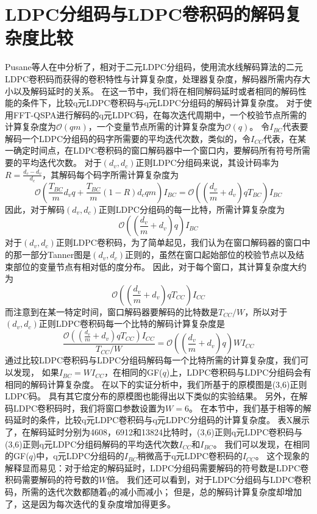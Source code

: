 \section{LDPC分组码与LDPC卷积码的解码复杂度比较}
Pusane等人在\parencite{5695133}中分析了，相对于二元LDPC分组码，使用流水线解码算法的二元LDPC卷积码而获得的卷积特性与计算复杂度，处理器复杂度，解码器所需内存大小以及解码延时的关系。
在这一节中，我们将在相同解码延时或者相同的解码性能的条件下，比较q元LDPC卷积码与q元LDPC分组码的解码计算复杂度。
对于使用FFT-QSPA进行解码的q元LDPC码，在每次迭代周期中，一个校验节点所需的计算复杂度为$\mathcal{O}(qm)$，一个变量节点所需的计算复杂度为$\mathcal{O}(q)$。
令$I_{BC}$代表要解码一个LDPC分组码的码字所需要的平均迭代次数，类似的，令$I_{CC}$代表，在某一确定时间点，在LDPC卷积码的窗口解码器中一个窗口内，要解码所有符号所需要的平均迭代次数。
对于$(d_v,d_c)$正则LDPC分组码来说，其设计码率为$R=\frac{d_c-d_v}{d_c}$，其解码每个码字所需计算复杂度为
\begin{equation}
\mathcal{O} \left(\frac{T_{BC}}{m}d_vq+\frac{T_{BC}}{m}\left(1-R\right)d_cqm\right)I_{BC}=\mathcal{O}\left(\left(\frac{d_v}{m}+d_v\right)qT_{BC}\right)I_{BC}
\end{equation}
因此，对于解码$(d_v,d_c)$正则LDPC分组码的每一比特，所需计算复杂度为
\begin{equation}
\mathcal{O}\left(\left(\frac{d_v}{m}+d_v\right)q\right)I_{BC}
\end{equation}
对于$(d_v,d_c)$正则LDPC卷积码，为了简单起见，我们认为在窗口解码器的窗口中的那一部分Tanner图是$(d_v,d_c)$正则的，虽然在窗口起始部位的校验节点以及结束部位的变量节点有相对低的度分布。
因此，对于每个窗口，其计算复杂度大约为
\begin{equation}
\mathcal{O}\left(\left(\frac{d_v}{m}+d_v\right)qT_{CC}\right)I_{CC}
\end{equation}
而注意到在某一特定时间，窗口解码器要解码的比特数是$T_{CC}/W$，所以对于$(d_v,d_c)$正则LDPC卷积码每一个比特的解码计算复杂度是
\begin{equation}
\frac{\mathcal{O}\left(\left(\frac{d_v}{m}+d_v\right)qT_{CC}\right)I_{CC}}{T_{CC}/W} = \mathcal{O}\left(\left(\frac{d_v}{m}+d_v\right)q\right)WI_{CC}
\end{equation}
通过比较LDPC卷积码与LDPC分组码解码每一个比特所需的计算复杂度，我们可以发现，
如果$I_{BC}=WI_{CC}$，在相同的GF($q$)上，LDPC卷积码与LDPC分组码会有相同的解码计算复杂度。
在以下的实证分析中，我们所基于的原模图是(3,6)正则LDPC码。
具有其它度分布的原模图也能得出以下类似的实验结果。
另外，在解码LDPC卷积码时，我们将窗口参数设置为$W=6$。
在本节中，我们基于相等的解码延时的条件，比较q元LDPC卷积码与q元LDPC分组码的计算复杂度。
表X展示了，在解码延时分别为4608，6912和13824比特时，(3,6)正则q元LDPC卷积码与(3,6)正则q元LDPC分组码解码的平均迭代次数$I_{CC}$和$I_{BC}$。
我们可以发现，在相同的GF($q$)中，q元LDPC分组码的$I_{BC}$稍微高于q元LDPC卷积码的$I_{CC}$。
这个现象的解释显而易见：对于给定的解码延时，LDPC分组码需要解码的符号数是LDPC卷积码需要解码的符号数的$W$倍。
我们还可以看到，对于LDPC分组码与LDPC卷积码，所需的迭代次数都随着$q$的减小而减小；
但是，总的解码计算复杂度却增加了，这是因为每次迭代的复杂度增加得更多。

